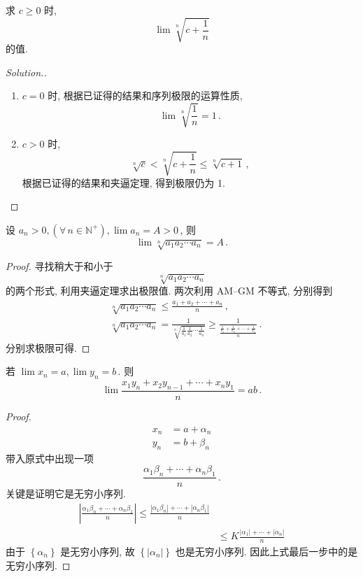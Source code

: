 \documentclass{book}
\newcommand{\Any}{\forall\,}
\newcommand{\set}[1]{\left\{#1\right\}}
\newcommand{\abs}[1]{\left\lvert #1 \right\rvert}
\newcommand{\N}{\mathbb{N}}
\renewcommand{\ge}{\geqslant}
\renewcommand{\le}{\leqslant}
\newenvironment{solution}{\begin{proof}[Solution.]}{\end{proof}}
\numberwithin{equation}{section}
\numberwithin{figure}{section}
\theoremstyle{definition}
\begin{document}
求 $c\ge0$ 时,
\begin{equation*}
  \lim\sqrt[n]{c+\frac{1}{n}}
\end{equation*}
的值.
\begin{solution}
  \leavevmode

  \begin{enumerate}
    \item $c=0$ 时, 根据已证得的结果和序列极限的运算性质,
      \begin{equation*}
	\lim\sqrt[n]{\frac{1}{n}}=1\,.
      \end{equation*}
    \item $c>0$ 时,
      \begin{equation*}
	\sqrt[n]{c}<\sqrt[n]{c+\frac{1}{n}}\le\sqrt[n]{c+1}\,,
      \end{equation*}
     根据已证得的结果和夹逼定理, 得到极限仍为 1.
  \end{enumerate}
\end{solution}

设 $a_n>0,(\Any n\in\N^+),\lim a_n=A>0$\,, 则
\begin{equation*}
  \lim\sqrt[n]{a_1a_2\cdots a_n}=A\,.
\end{equation*}
\begin{proof}
  寻找稍大于和小于
  \begin{equation*}
    \sqrt[n]{a_1a_2\cdots a_n}
  \end{equation*}
  的两个形式, 利用夹逼定理求出极限值.
  两次利用 AM--GM 不等式, 分别得到
  \begin{align*}
    &\sqrt[n]{a_1a_2\cdots a_n}\le\frac{a_1+a_2+\cdots+a_n}{n}\,,\\
    &\sqrt[n]{a_1a_2\cdots a_n}=\frac{1}{\sqrt[n]{\frac{1}{a_1}\frac{1}{a_2}\cdots\frac{1}{a_n}}}\ge\frac{1}{\frac{\frac{1}{a_1}+\frac{1}{a_2}+\cdots+\frac{1}{a_n}}{n}}\,.
  \end{align*}
  分别求极限可得.
\end{proof}

若 $\lim x_n=a,\lim y_n=b$\,. 则
\begin{equation*}
  \lim \frac{x_1y_n+x_2y_{n-1}+\cdots+x_ny_1}{n}=ab\,.
\end{equation*}
\begin{proof}
  \begin{align*}
    x_n&=a+\alpha_n\\
    y_n&=b+\beta_n
  \end{align*}
  带入原式中出现一项
  \begin{equation*}
    \frac{\alpha_1\beta_n+\cdots+\alpha_n\beta_1}{n}\,.
  \end{equation*}
  关键是证明它是无穷小序列. 
  \begin{align*}
    \abs{\frac{\alpha_1\beta_n+\cdots+\alpha_n\beta_1}{n}}\le\frac{\abs{\alpha_1\beta_n}+\cdots+\abs{\alpha_n\beta_1}}{n}\\
    &\le K\frac{\abs{\alpha_1}+\cdots+\abs{\alpha_n}}{n}
  \end{align*}
  由于 $\set{\alpha_n}$ 是无穷小序列, 故 $\set{\abs{\alpha_n}}$ 也是无穷小序列. 因此上式最后一步中的是无穷小序列.
\end{proof}
\end{document}
